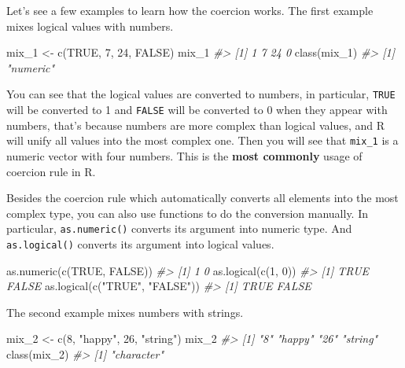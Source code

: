 \documentclass[
]{book}
\newenvironment{Shaded}{\begin{snugshade}}{\end{snugshade}}
\newcommand{\CommentTok}[1]{\textcolor[rgb]{0.56,0.35,0.01}{\textit{#1}}}
\newcommand{\ConstantTok}[1]{\textcolor[rgb]{0.00,0.00,0.00}{#1}}
\newcommand{\DecValTok}[1]{\textcolor[rgb]{0.00,0.00,0.81}{#1}}
\newcommand{\FunctionTok}[1]{\textcolor[rgb]{0.00,0.00,0.00}{#1}}
\newcommand{\NormalTok}[1]{#1}
\newcommand{\OtherTok}[1]{\textcolor[rgb]{0.56,0.35,0.01}{#1}}
\newcommand{\StringTok}[1]{\textcolor[rgb]{0.31,0.60,0.02}{#1}}
\begin{document}
Let's see a few examples to learn how the coercion works. The first example mixes logical values with numbers.

\begin{Shaded}
\begin{Highlighting}[]
\NormalTok{mix\_1 }\OtherTok{\textless{}{-}} \FunctionTok{c}\NormalTok{(}\ConstantTok{TRUE}\NormalTok{, }\DecValTok{7}\NormalTok{, }\DecValTok{24}\NormalTok{, }\ConstantTok{FALSE}\NormalTok{)}
\NormalTok{mix\_1 }
\CommentTok{\#\textgreater{} [1]  1  7 24  0}
\FunctionTok{class}\NormalTok{(mix\_1)}
\CommentTok{\#\textgreater{} [1] "numeric"}
\end{Highlighting}
\end{Shaded}

You can see that the logical values are converted to numbers, in particular, \texttt{TRUE} will be converted to 1 and \texttt{FALSE} will be converted to 0 when they appear with numbers, that's because numbers are more complex than logical values, and R will unify all values into the most complex one. Then you will see that \texttt{mix\_1} is a numeric vector with four numbers. This is the \textbf{most commonly} usage of coercion rule in R.

Besides the coercion rule which automatically converts all elements into the most complex type, you can also use functions to do the conversion manually. In particular, \texttt{as.numeric()} converts its argument into numeric type. And \texttt{as.logical()} converts its argument into logical values.

\begin{Shaded}
\begin{Highlighting}[]
\FunctionTok{as.numeric}\NormalTok{(}\FunctionTok{c}\NormalTok{(}\ConstantTok{TRUE}\NormalTok{, }\ConstantTok{FALSE}\NormalTok{))}
\CommentTok{\#\textgreater{} [1] 1 0}
\FunctionTok{as.logical}\NormalTok{(}\FunctionTok{c}\NormalTok{(}\DecValTok{1}\NormalTok{, }\DecValTok{0}\NormalTok{))}
\CommentTok{\#\textgreater{} [1]  TRUE FALSE}
\FunctionTok{as.logical}\NormalTok{(}\FunctionTok{c}\NormalTok{(}\StringTok{"TRUE"}\NormalTok{, }\StringTok{"FALSE"}\NormalTok{))}
\CommentTok{\#\textgreater{} [1]  TRUE FALSE}
\end{Highlighting}
\end{Shaded}

The second example mixes numbers with strings.

\begin{Shaded}
\begin{Highlighting}[]
\NormalTok{mix\_2 }\OtherTok{\textless{}{-}} \FunctionTok{c}\NormalTok{(}\DecValTok{8}\NormalTok{, }\StringTok{"happy"}\NormalTok{, }\DecValTok{26}\NormalTok{, }\StringTok{"string"}\NormalTok{)}
\NormalTok{mix\_2 }
\CommentTok{\#\textgreater{} [1] "8"      "happy"  "26"     "string"}
\FunctionTok{class}\NormalTok{(mix\_2)}
\CommentTok{\#\textgreater{} [1] "character"}
\end{Highlighting}
\end{Shaded}
\end{document}
